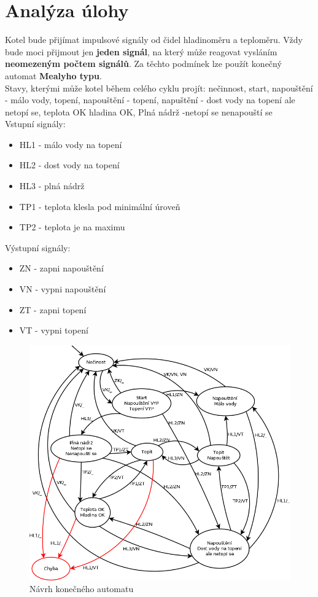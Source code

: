 \documentclass[12pt]{report}
\begin{document}
\chapter{Analýza úlohy}
Kotel bude přijímat impulsové signály od čidel hladinoměru a teploměru. Vždy bude moci přijmout jen \textbf{jeden signál}, na který může reagovat vysláním \textbf{neomezeným počtem signálů}.
Za těchto podmínek lze použít konečný automat \textbf{Mealyho typu}.\\
Stavy, kterými může kotel během celého cyklu projít: nečinnost, start, napouštění - málo vody, topení, napouštění - topení, napuštění - dost vody na topení ale netopí se, teplota OK hladina OK, Plná nádrž -netopí se nenapouští se\\

Vstupní signály: 
\begin{itemize}
\item HL1 - málo vody na topení
\item HL2 - dost vody na topení
\item HL3 - plná nádrž
\item TP1 - teplota klesla pod minimální úroveň
\item TP2 - teplota je na maximu
\end{itemize}

Výstupní signály: 
\begin{itemize}
\item ZN - zapni napouštění
\item VN - vypni napouštění
\item ZT - zapni topení
\item VT - vypni topení
\end{itemize}



\begin{figure}[h]
		\centering
		\includegraphics[width=\textwidth]{./images/graf.png}	
		\caption{Návrh konečného automatu}
\end{figure}
\end{document}
